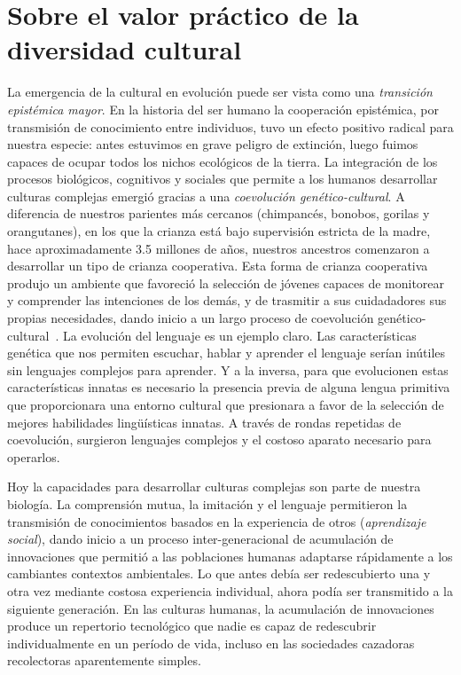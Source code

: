 \documentclass[a4paper,11pt]{book}
\theoremstyle{definition}
\begin{document}
\section{Sobre el valor pr\'actico de la diversidad cultural}


La emergencia de la cultural en evoluci\'on puede ser vista como una \emph{transici\'on epist\'emica mayor}.
%
En la historia del ser humano la cooperaci\'on epist\'emica, por transmisi\'on de conocimiento entre individuos, tuvo un efecto positivo radical para nuestra especie: antes estuvimos en grave peligro de extinci\'on, luego fuimos capaces de ocupar todos los nichos ecol\'ogicos de la tierra.
%
La integraci\'on de los procesos biol\'ogicos, cognitivos y sociales que permite a los humanos desarrollar culturas complejas emergi\'o gracias a una \emph{coevoluci\'on gen\'etico-cultural}.
%
A diferencia de nuestros parientes m\'as cercanos (chimpanc\'es, bonobos, gorilas y orangutanes), en los que la crianza est\'a bajo supervisi\'on estricta de la madre, hace aproximadamente 3.5 millones de a\~nos, nuestros ancestros comenzaron a desarrollar un tipo de crianza cooperativa.
%
Esta forma de crianza cooperativa produjo un ambiente que favoreci\'o la selecci\'on de j\'ovenes capaces de monitorear y comprender las intenciones de los dem\'as, y de trasmitir a sus cuidadadores sus propias necesidades, dando inicio a un largo proceso de coevoluci\'on gen\'etico-cultural~\cite{hrdy2020-emotionallyModern}.
%
La evoluci\'on del lenguaje es un ejemplo claro.
%
Las caracter\'isticas gen\'etica que nos permiten escuchar, hablar y aprender el lenguaje ser\'ian in\'utiles sin lenguajes complejos para aprender.
%
Y a la inversa, para que evolucionen estas caracter\'isticas innatas es necesario la presencia previa de alguna lengua primitiva que proporcionara una entorno cultural que presionara a favor de la selecci\'on de mejores habilidades ling\"u\'isticas innatas.
%
A trav\'es de rondas repetidas de coevoluci\'on, surgieron lenguajes complejos y el costoso aparato necesario para operarlos.


Hoy la capacidades para desarrollar culturas complejas son parte de nuestra biolog\'ia.
%
La comprensi\'on mutua, la imitaci\'on y el lenguaje permitieron la transmisi\'on de conocimientos basados en la experiencia de otros (\emph{aprendizaje social}), dando inicio a un proceso inter-generacional de acumulaci\'on de innovaciones que permiti\'o a las poblaciones humanas adaptarse r\'apidamente a los cambiantes contextos ambientales.
%
Lo que antes deb\'ia ser redescubierto una y otra vez mediante costosa experiencia individual, ahora pod\'ia ser transmitido a la siguiente generaci\'on.
%
En las culturas humanas, la acumulaci\'on de innovaciones produce un repertorio tecnol\'ogico que nadie es capaz de redescubrir individualmente en un per\'iodo de vida, incluso en las sociedades cazadoras recolectoras aparentemente simples.
\end{document}
